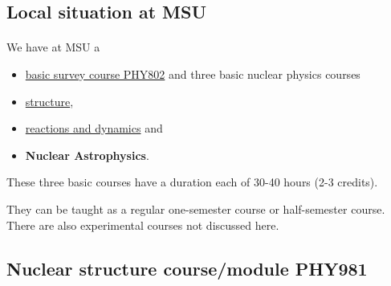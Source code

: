 \documentclass[%
twoside,                 %
final,                   %
10pt]{article}
\begin{document}
\noindent




\subsection{Local situation at MSU}

\paragraph{}

We have at MSU a  
\begin{itemize}
\item \href{{https://people.nscl.msu.edu/~witek/Classes/PHY802/NuclPhys802-2015.html}}{basic survey course PHY802}  and three basic nuclear physics courses 

\item \href{{http://nuclearstructure.github.io/PHY981/doc/web/course.html}}{structure}, 

\item \href{{https://people.nscl.msu.edu/~nunes/phy982/phy982web2015.htm}}{reactions and dynamics}  and 

\item \textbf{Nuclear Astrophysics}. 
\end{itemize}

\noindent
These three basic courses have a duration each  of 30-40 hours (2-3 credits).   

They can be taught as a regular one-semester course or half-semester course. There are also experimental courses not discussed here.







\subsection{Nuclear structure course/module  PHY981}

\end{document}
